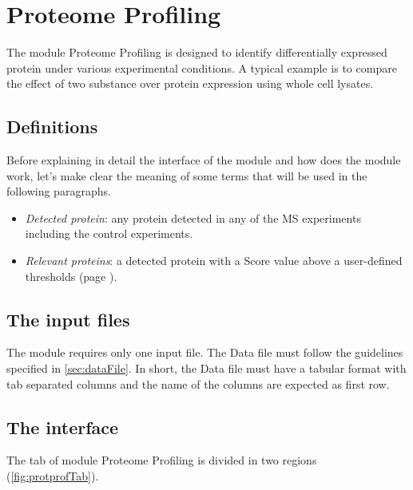 \chapter{Proteome Profiling}
\label{chap:protprof}

The module Proteome Profiling is designed to identify differentially expressed
protein under various experimental conditions. A typical example is to compare the
effect of two substance over protein expression using whole cell lysates.

\section{Definitions}

Before explaining in detail the interface of the module and how does the module work,
let's make clear the meaning of some terms that will be used in the following paragraphs.

\begin{itemize}
    \item \textit{Detected protein}: any protein detected in any of the MS
    experiments including the control experiments.
    \item \textit{Relevant proteins}: a detected protein with a Score value above
    a user-defined thresholds (page \pageref{par:protprofScoreValue}).
\end{itemize}

\section{The input files}

The module requires only one input file. The Data file must follow
the guidelines specified in \autoref{sec:dataFile}. In short, the Data file must
have a tabular format with tab separated columns and the name of the columns are
expected as first row.

\section{The interface}

The tab of module Proteome Profiling is divided in two regions (\autoref{fig:protprofTab}).

